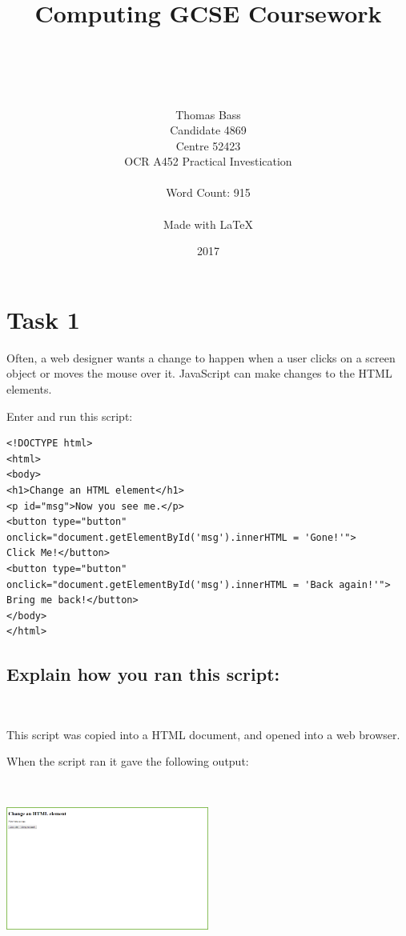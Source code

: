 \documentclass[a4paper]{article}
\title{Computing GCSE Coursework}
\author{\\ \\ \\ \\ Thomas Bass\\Candidate 4869\\Centre 52423\\OCR A452 Practical Investication\\\\Word Count: 915\\\\Made with \LaTeX}
\date{2017}
\begin{document}
\maketitle
\pagebreak
\renewcommand*\contentsname{Summary}
\tableofcontents
\pagebreak


\section{Task 1}
Often, a web designer wants a change to happen when a user clicks on a screen object or moves the mouse over it. JavaScript can make changes to the HTML elements. \par
\noindent Enter and run this script: \par \par
\begin{lstlisting}
<!DOCTYPE html>
<html>
<body>
<h1>Change an HTML element</h1>
<p id="msg">Now you see me.</p>
<button type="button"
onclick="document.getElementById('msg').innerHTML = 'Gone!'">
Click Me!</button>
<button type="button"
onclick="document.getElementById('msg').innerHTML = 'Back again!'">
Bring me back!</button>
</body>
</html>
\end{lstlisting}
	

\subsection{Explain how you ran this script:} ~\par	

This script was copied into a HTML document, and opened into a web browser. 

When the script ran it gave the following output: ~\par ~\par
\noindent\includegraphics[width=0.5\textwidth, left, width=\linewidth, frame]{Picture1.png}
\end{document}
